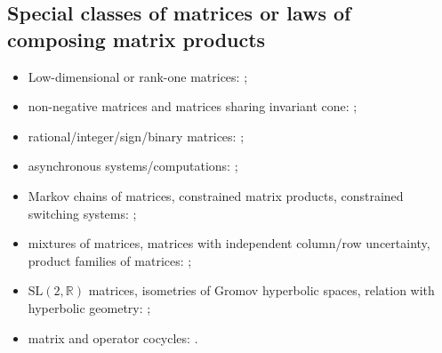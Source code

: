 \documentclass[a4paper,fleqn]{article}
\let\cite=\citep
\begin{document}
\subsection*{Special classes of matrices or laws of composing matrix products}
\begin{itemize}
  \item Low-dimensional or rank-one matrices: \cite{ABY:CMH10, ASU:I11,
      AKKK:92:e, AvilaRob:JMD09, BB:TCS02, CGSZ:LAA10, Dai:ArXiv11,
      DHLX:LAA12, FayKri:N08, Klep:AIT85:e, JM:LAA13, LiuXiao:LNCS12,
      LuiOli:AMC14, Morris:ArXiv11, Moss:ACM10, Saouter:inria96, Yoc:MDSA04};
  \item non-negative matrices and matrices sharing invariant cone:
    \cite{Alpin:MZ10, Bui:LAA22, BZ:AMPA18, CACJ:DLT19, CACJ:FI21,
      GhaAna:TCS05, GSM:IEEETAC07, JPB:LAA08, Jungers:LAA12, LP:LAA27,
      NesPro:SIAMJMAA13, PJB:SIAMJMAA10, Prot:RMS10, ProtCvet:MP20,
      ProtVoyn:LAA12, Thomas:ArXiv10, RSS:LAA10};
  \item rational/integer/sign/binary matrices: \cite{BC:TCS03, BCH:SF16,
      BT:SCL00, BT:IPL97, BB:TCS02, CGSZ:LAA10, CiconePhD11, JB:LAA08,
      JPB:LAA08, PanScl:Nonlin21, TB:MCSS97:1};
  \item asynchronous systems/computations: \cite{AKKK:92:e, AKKK:MCM90,
      ADFP:93, AKKKP:88, ChM:LAA69, FroSpi01, FromSzyld:JCAM00, Klep:AIT85:e,
      Koz:AiT90:10:e, Koz:AiT90:8:e, Koz:DAN90:311:e, Koz:AiT91:e,
      LubMit:JACM86, SBKK:LAA98};
  \item Markov chains of matrices, constrained matrix products, constrained
    switching systems: \cite{ASJ:IEEECSL17, Dai:LAA12, DHH:ArXiv14,
      DRD:IEEETAC18, GhaAna:TCS05, Koz:LAA14, Koz:LAA14:2, MOS:LAA07,
      PEDJ:Autom16, PhilJung:ICHS15, XuAci:IEEETAC20, ZhangXu:ArXiv20,
      ZSD:CCC21};
  \item mixtures of matrices, matrices with independent column/row uncertainty,
    product families of matrices: \cite{ACDDHK:STACS15, AGM:ArXiv24,
      AGMM:CDC25, AKKK:92:e, BN:SIAMJMAA09, KKKK:AiT83:7:e, KKKK:AiT84:3:e,
      KKKK:AiT84:8:e, KKKK:DAN84:e, Koz:BCRI03-13, Koz:LAA16, Koz:WSDV16,
      Koz:LMA17, Koz:DCDSB19, Koz:INFOPROC16:e, NesPro:SIAMJMAA13};
  \item $\textrm{SL}(2,\mathbb{R})$ matrices, isometries of
    Gromov hyperbolic spaces, relation with hyperbolic geometry:
    \cite{ABY:CMH10, AvilaRob:JMD09, BF:AIF21, BochiRams:JMD16,
      BreSert:LMS21, FayKri:N08, Gao:ArXiv25, Gao:BLMS26, Oreg-Reyes:MastThes18,
      Oreg-Reyes:GGD18, PanScl:Nonlin21, Yoc:MDSA04, ZCL:DCDSA18};
  \item matrix and operator cocycles: \cite{ABY:CMH10, BD:StochDyn21,
      Bochi:PAMS26, DHX:ArXiv13:1, Morris:JFA12, Yoc:MDSA04}.
\end{itemize}
\end{document}
